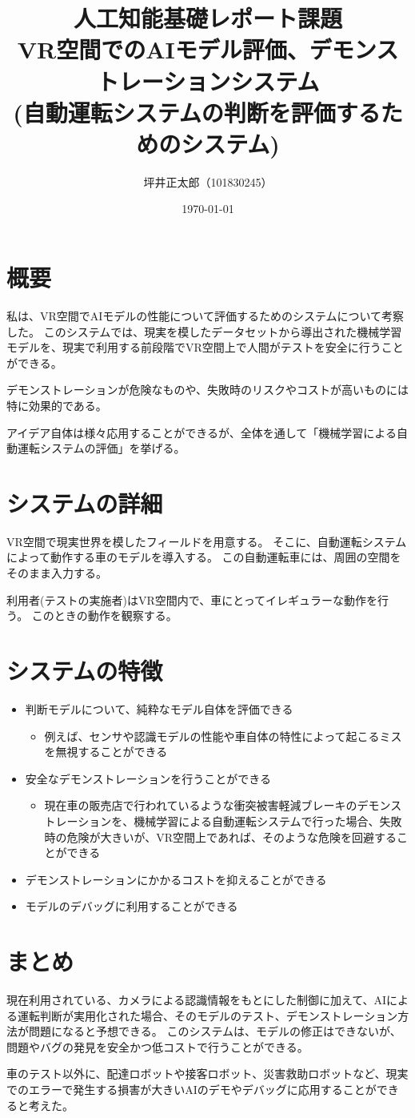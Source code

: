 \documentclass[a4paper,10pt]{jsarticle}
\begin{document}
\title{人工知能基礎レポート課題\\VR空間でのAIモデル評価、デモンストレーションシステム\\(自動運転システムの判断を評価するためのシステム)}
\author{坪井正太郎（101830245）}
\date{\today}
\maketitle
\section{概要}
私は、VR空間でAIモデルの性能について評価するためのシステムについて考察した。
このシステムでは、現実を模したデータセットから導出された機械学習モデルを、現実で利用する前段階でVR空間上で人間がテストを安全に行うことができる。

デモンストレーションが危険なものや、失敗時のリスクやコストが高いものには特に効果的である。

アイデア自体は様々応用することができるが、全体を通して「機械学習による自動運転システムの評価」を挙げる。

\section{システムの詳細}
VR空間で現実世界を模したフィールドを用意する。
そこに、自動運転システムによって動作する車のモデルを導入する。
この自動運転車には、周囲の空間をそのまま入力する。

利用者(テストの実施者)はVR空間内で、車にとってイレギュラーな動作を行う。
このときの動作を観察する。

\section{システムの特徴}
\begin{itemize}
  \item 判断モデルについて、純粋なモデル自体を評価できる
        \begin{itemize}
          \item 例えば、センサや認識モデルの性能や車自体の特性によって起こるミスを無視することができる
        \end{itemize}
  \item 安全なデモンストレーションを行うことができる
  \begin{itemize}
    \item 現在車の販売店で行われているような衝突被害軽減ブレーキのデモンストレーションを、機械学習による自動運転システムで行った場合、失敗時の危険が大きいが、VR空間上であれば、そのような危険を回避することができる
  \end{itemize}
  \item デモンストレーションにかかるコストを抑えることができる
  \item モデルのデバッグに利用することができる
\end{itemize}

\section{まとめ}
現在利用されている、カメラによる認識情報をもとにした制御に加えて、AIによる運転判断が実用化された場合、そのモデルのテスト、デモンストレーション方法が問題になると予想できる。
このシステムは、モデルの修正はできないが、問題やバグの発見を安全かつ低コストで行うことができる。

車のテスト以外に、配達ロボットや接客ロボット、災害救助ロボットなど、現実でのエラーで発生する損害が大きいAIのデモやデバッグに応用することができると考えた。
\end{document}

